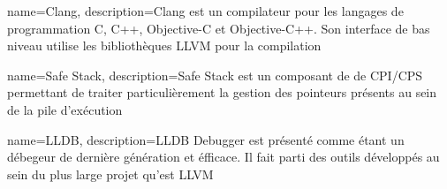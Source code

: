 {
	name={Clang},
	description={Clang est un compilateur pour les langages de programmation C, C++, Objective-C et Objective-C++. Son interface de bas niveau utilise les bibliothèques LLVM pour la compilation}
}

{
	name={Safe Stack},
	description={Safe Stack est un composant de de CPI/CPS permettant de traiter particulièrement la gestion des pointeurs présents au sein de la pile d'exécution}
}

{
	name={LLDB},
	description={LLDB Debugger est présenté comme étant un débegeur de dernière génération et éfficace. Il fait parti des outils développés au sein du plus large projet qu'est LLVM}
}






%
%
%
%
%
%
%
%
%
%
